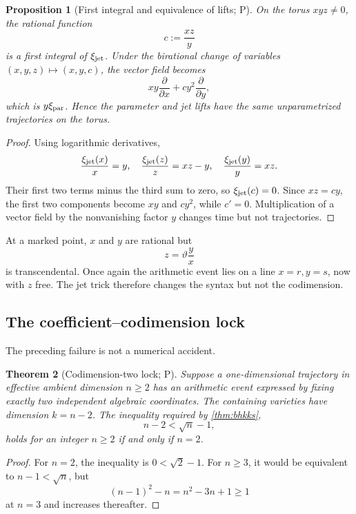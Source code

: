 \documentclass[10pt,oneside]{article}
\newtheorem{theorem}{Theorem}[section]
\newtheorem{proposition}[theorem]{Proposition}
\theoremstyle{definition}
\theoremstyle{remark}
\newcommand{\thetaq}{\vartheta}
\newcommand{\statusP}{\textsc{P}}
\begin{document}
\begin{proposition}[First integral and equivalence of lifts; \statusP]
\label{prop:lifts-equivalent}
On the torus \(xyz\ne0\), the rational function
\[
 c:=\frac{xz}{y}
\]
is a first integral of \(\xi_{\rm jet}\).  Under the birational change of variables \((x,y,z)\mapsto(x,y,c)\), the vector field becomes
\[
 xy\frac{\partial}{\partial x}
 +cy^2\frac{\partial}{\partial y},
\]
which is \(y\xi_{\rm par}\).  Hence the parameter and jet lifts have the same unparametrized trajectories on the torus.
\end{proposition}

\begin{proof}
Using logarithmic derivatives,
\[
 \frac{\xi_{\rm jet}(x)}x=y,
 \quad
 \frac{\xi_{\rm jet}(z)}z=xz-y,
 \quad
 \frac{\xi_{\rm jet}(y)}y=xz.
\]
Their first two terms minus the third sum to zero, so \(\xi_{\rm jet}(c)=0\).  Since \(xz=cy\), the first two components become \(xy\) and \(cy^2\), while \(c'=0\).  Multiplication of a vector field by the nonvanishing factor \(y\) changes time but not trajectories.
\end{proof}

At a marked point, \(x\) and \(y\) are rational but
\[
 z=\thetaq\frac yx
\]
is transcendental.  Once again the arithmetic event lies on a line \(x=r,y=s\), now with \(z\) free.  The jet trick therefore changes the syntax but not the codimension.

\subsection{The coefficient--codimension lock}
The preceding failure is not a numerical accident.

\begin{theorem}[Codimension-two lock; \statusP]
\label{thm:codim-lock}
Suppose a one-dimensional trajectory in effective ambient dimension \(n\ge2\) has an arithmetic event expressed by fixing exactly two independent algebraic coordinates.  The containing varieties have dimension \(k=n-2\).  The inequality required by \cref{thm:bhkks},
\[
 n-2<\sqrt n-1,
\]
holds for an integer \(n\ge2\) if and only if \(n=2\).
\end{theorem}

\begin{proof}
For \(n=2\), the inequality is \(0<\sqrt2-1\).  For \(n\ge3\), it would be equivalent to \(n-1<\sqrt n\), but
\[
 (n-1)^2-n=n^2-3n+1\ge1
\]
at \(n=3\) and increases thereafter.
\end{proof}
\end{document}
